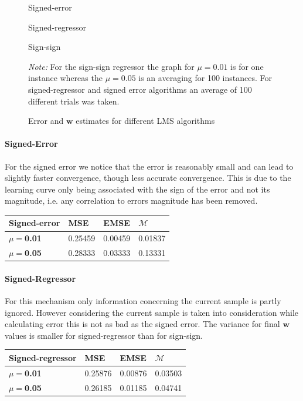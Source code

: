 \documentclass[10pt,twoside,a4paper]{report}
\begin{document}
\begin{figure}[h!]
\centering
Signed-error
\resizebox{\textwidth}{!}{}

Signed-regressor
\resizebox{\textwidth}{!}{}



Sign-sign
\resizebox{\textwidth}{!}{}



\textit{Note:} For the sign-sign regressor the graph for $\mu=0.01$ is for one instance whereas the $\mu=0.05$ is an averaging for 100 instances. For signed-regressor and signed error algorithms an average of 100 different trials was taken.
\caption{Error and $\mathbf{w}$ estimates for different LMS algorithms}
\label{fig:3_1e}
\end{figure}


\paragraph{Signed-Error} For the signed error we notice that the error is reasonably small and can lead to slightly faster convergence, though less accurate convergence. This is due to the learning curve only being associated with the sign of the error and not its magnitude, i.e. any correlation to errors magnitude has been removed.
\begin{table}[h!]
\centering
\begin{tabular}{|l|l|l|l|}
\hline
Signed-error              & \textbf{MSE} & \textbf{EMSE} & $\mathcal{M}$ \\ \hline
$\mu=$\textbf{0.01} & 0.25459 & 0.00459 & 0.01837        \\ \hline
$\mu=$\textbf{0.05} & 0.28333 & 0.03333 & 0.13331       \\ \hline
\end{tabular}
\end{table}

\paragraph{Signed-Regressor} For this mechanism only information concerning the current sample is partly ignored. However considering the current sample is taken into consideration while calculating error this is not as bad as the signed error. The variance for final $\mathbf{w}$ values is smaller for signed-regressor than for sign-sign.
\begin{table}[h!]
\centering
\begin{tabular}{|l|l|l|l|}
\hline
 Signed-regressor             & \textbf{MSE} & \textbf{EMSE} & $\mathcal{M}$ \\ \hline
$\mu=$\textbf{0.01} & 0.25876 & 0.00876 & 0.03503        \\ \hline
$\mu=$\textbf{0.05} & 0.26185 & 0.01185 & 0.04741       \\ \hline
\end{tabular}
\end{table}
\end{document}
